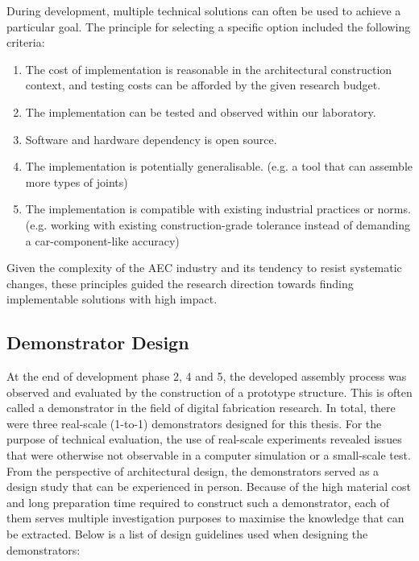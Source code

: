 During development, multiple technical solutions can often be used to achieve a particular goal. The principle for selecting a specific option included the following criteria: 

\begin{enumerate}
	\item The cost of implementation is reasonable in the architectural construction context, and testing costs can be afforded by the given research budget.

	\item The implementation can be tested and observed within our laboratory.

	\item Software and hardware dependency is open source.

	\item The implementation is potentially generalisable. (e.g. a tool that can assemble more types of joints)

	\item The implementation is compatible with existing industrial practices or norms. (e.g. working with existing construction-grade tolerance instead of demanding a car-component-like accuracy) 

\end{enumerate}
Given the complexity of the AEC industry and its tendency to resist systematic changes, these principles guided the research direction towards finding implementable solutions with high impact.

\subsection{Demonstrator Design}
\label{subsection:methodology_demonstraror_design}

At the end of development phase 2, 4 and 5, the developed assembly process was observed and evaluated by the construction of a prototype structure. This is often called a demonstrator in the field of digital fabrication research. In total, there were three real-scale (1-to-1) demonstrators designed for this thesis. For the purpose of technical evaluation, the use of real-scale experiments revealed issues that were otherwise not observable in a computer simulation or a small-scale test. From the perspective of architectural design, the demonstrators served as a design study that can be experienced in person. Because of the high material cost and long preparation time required to construct such a demonstrator, each of them serves multiple investigation purposes to maximise the knowledge that can be extracted. Below is a list of design guidelines used when designing the demonstrators:

